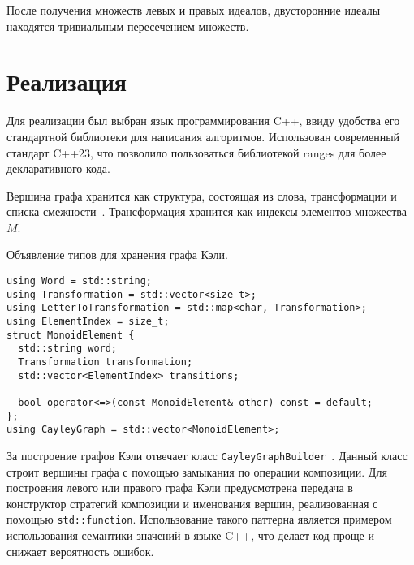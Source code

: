 \documentclass[14pt, russian]{scrartcl}
\begin{document}
После получения множеств левых и правых идеалов, двусторонние идеалы находятся
тривиальным пересечением множеств.

\newpage
\section{Реализация}

Для реализации был выбран язык программирования C++, ввиду удобства его
стандартной библиотеки для написания алгоритмов. Использован современный
стандарт C++23, что позволило пользоваться библиотекой ranges для более
декларативного кода.

Вершина графа хранится как структура, состоящая из слова, трансформации и списка
смежности~. Трансформация хранится как индексы
элементов множества $M$.

\begin{listing}[!htb]
\caption{Объявление типов для хранения графа Кэли.}
\label{lst:monoid_models}
  \begin{verbatim}
using Word = std::string;
using Transformation = std::vector<size_t>;
using LetterToTransformation = std::map<char, Transformation>;
using ElementIndex = size_t;
struct MonoidElement {
  std::string word;
  Transformation transformation;
  std::vector<ElementIndex> transitions;

  bool operator<=>(const MonoidElement& other) const = default;
};
using CayleyGraph = std::vector<MonoidElement>;
  \end{verbatim}
\end{listing}

За построение графов Кэли отвечает класс
\verb|CayleyGraphBuilder|~. Данный класс строит
вершины графа с помощью замыкания по операции композиции. Для построения левого
или правого графа Кэли предусмотрена передача в конструктор стратегий композиции
и именования вершин, реализованная с помощью \verb|std::function|. Использование
такого паттерна является примером использования семантики значений в языке C++,
что делает код проще и снижает вероятность ошибок.
\end{document}
